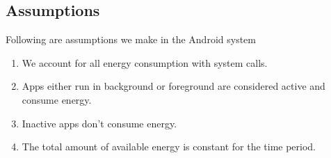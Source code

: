 \subsection{Assumptions}

Following are assumptions we make in the Android system
\begin{enumerate}

\item  We account for all energy consumption with system calls.
\item  Apps either run in background or foreground are considered active and consume energy.
\item  Inactive apps don't consume energy.
\item  The total amount of available energy is constant for the time period.

\end{enumerate}




















